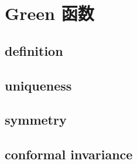 \section{Green 函数}
\label{b3:sec:1701}


\subsection{definition}
\label{b3:subsec:170101}

\subsection{uniqueness}
\label{b3:subsec:170102}

\subsection{symmetry}
\label{b3:subsec:170103}

\subsection{conformal invariance}
\label{b3:subsec:170104}


